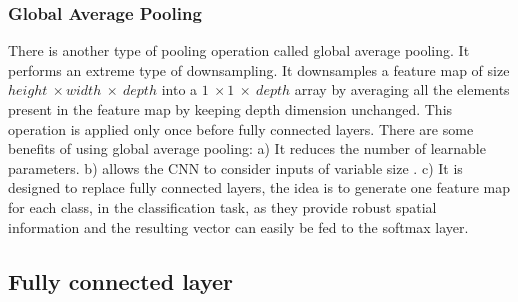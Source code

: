 \subsubsection{Global Average Pooling}
There is another type of pooling operation called global average pooling. It performs an extreme type of downsampling. It downsamples a feature map of size $height\ \times width\ \times\ depth$ into a $1\ \times 1\ \times\ depth$ array by averaging all the elements present in the feature map by keeping depth dimension unchanged. This operation is applied only once before fully connected layers. There are some benefits of using global average pooling: a)  It reduces the number of learnable parameters. b) allows the \ac{CNN} to consider inputs of variable size \cite{articleCNNs} \cite{lin2014network}. c) It is designed to replace fully connected layers, the idea is to generate one feature map for each class, in the classification task, as they provide robust spatial information and the resulting vector can easily be fed to the softmax layer\footnotemark.






\subsection{Fully connected layer}

